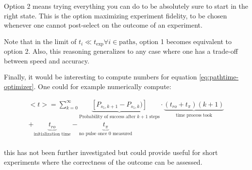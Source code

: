 Option 2 means trying everything you can do to be absolutely sure to start in the right state. This is the option maximizing experiment fidelity, to be chosen whenever one cannot post-select on the outcome of an experiment. 

Note that in the limit of $t_i \ll t_\mathrm{exp} \forall i \in \mathrm{paths}$, option 1 becomes equivalent to option 2. Also, this reasoning generalizes to any case where one has a trade-off between speed and accuracy. 

Finally, it would be interesting to compute numbers for equation \ref{eq:pathtime-optimizer}. One could for example numerically compute: 

\begin{equation}
\begin{split}
    < t > = \sum_{k = 0 }^\infty \underbrace{\left[P_{s_5,k+1} - P_{s_5,k})\right]}_{\text{Probability of success after } k+1 \text{ steps}}\cdot \underbrace{(t_{ro} + t_\pi)(k+1)}_{\text{time process took}} \\ + \underbrace{t_{ro}}_{\text{initialization time}} - \underbrace{t_{\pi}}_{\text{no pulse once 0 measured}}\\ 
\end{split}
\end{equation}

this has not been further investigated but could provide useful for short experiments where the correctness of the outcome can be assessed. 